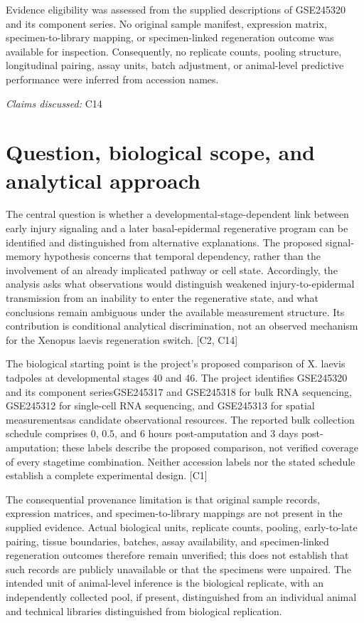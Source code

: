 \documentclass[11pt]{article}
\begin{document}
Evidence eligibility was assessed from the supplied descriptions of GSE245320 and its component series. No original sample manifest, expression matrix, specimen-to-library mapping, or specimen-linked regeneration outcome was available for inspection. Consequently, no replicate counts, pooling structure, longitudinal pairing, assay units, batch adjustment, or animal-level predictive performance were inferred from accession names.

\textit{Claims discussed: }C14
\section{Question, biological scope, and analytical approach}
The central question is whether a developmental-stage-dependent link between early injury signaling and a later basal-epidermal regenerative program can be identified and distinguished from alternative explanations. The proposed signal-memory hypothesis concerns that temporal dependency, rather than the involvement of an already implicated pathway or cell state. Accordingly, the analysis asks what observations would distinguish weakened injury-to-epidermal transmission from an inability to enter the regenerative state, and what conclusions remain ambiguous under the available measurement structure. Its contribution is conditional analytical discrimination, not an observed mechanism for the Xenopus laevis regeneration switch. [C2, C14]

The biological starting point is the project's proposed comparison of X. laevis tadpoles at developmental stages 40 and 46. The project identifies GSE245320 and its component series\textemdash{}GSE245317 and GSE245318 for bulk RNA sequencing, GSE245312 for single-cell RNA sequencing, and GSE245313 for spatial measurements\textemdash{}as candidate observational resources. The reported bulk collection schedule comprises $0$, $0.5$, and $6$ hours post-amputation and $3$ days post-amputation; these labels describe the proposed comparison, not verified coverage of every stage\textendash{}time combination. Neither accession labels nor the stated schedule establish a complete experimental design. [C1]

The consequential provenance limitation is that original sample records, expression matrices, and specimen-to-library mappings are not present in the supplied evidence. Actual biological units, replicate counts, pooling, early-to-late pairing, tissue boundaries, batches, assay availability, and specimen-linked regeneration outcomes therefore remain unverified; this does not establish that such records are publicly unavailable or that the specimens were unpaired. The intended unit of animal-level inference is the biological replicate, with an independently collected pool, if present, distinguished from an individual animal and technical libraries distinguished from biological replication.
\end{document}

